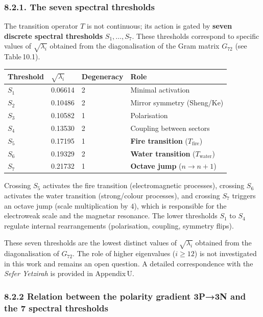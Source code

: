 \documentclass[11pt]{article}
\begin{document}
\hypertarget{the-seven-spectral-thresholds}{%
\subsubsection{8.2.1. The seven spectral
thresholds}\label{the-seven-spectral-thresholds}}

The transition operator \(T\) is not continuous; its action is gated by
\textbf{seven discrete spectral thresholds} \(S_1,\ldots,S_7\). These
thresholds correspond to specific values of \(\sqrt{\lambda_i}\)
obtained from the diagonalisation of the Gram matrix \(G_{72}\) (see
Table\,10.1).

\begin{longtable}[]{@{}llll@{}}
\toprule
Threshold & \(\sqrt{\lambda_i}\) & Degeneracy & Role \\
\midrule
\endhead
\(S_1\) & 0.06614 & 2 & Minimal activation \\
\(S_2\) & 0.10486 & 2 & Mirror symmetry (Sheng/Ke) \\
\(S_3\) & 0.10582 & 1 & Polarisation \\
\(S_4\) & 0.13530 & 2 & Coupling between sectors \\
\(S_5\) & 0.17195 & 1 & \textbf{Fire transition}
(\(T_{\text{fire}}\)) \\
\(S_6\) & 0.19329 & 2 & \textbf{Water transition}
(\(T_{\text{water}}\)) \\
\(S_7\) & 0.21732 & 1 & \textbf{Octave jump} (\(n \to n+1\)) \\
\bottomrule
\end{longtable}

Crossing \(S_5\) activates the fire transition (electromagnetic
processes), crossing \(S_6\) activates the water transition
(strong/colour processes), and crossing \(S_7\) triggers an octave jump
(scale multiplication by \(4\)), which is responsible for the
electroweak scale and the magnetar resonance. The lower thresholds
\(S_1\) to \(S_4\) regulate internal rearrangements (polarisation,
coupling, symmetry flips).

These seven thresholds are the lowest distinct values of
\(\sqrt{\lambda_i}\) obtained from the diagonalisation of \(G_{72}\).
The role of higher eigenvalues (\(i \ge 12\)) is not investigated in
this work and remains an open question. A detailed correspondence with
the \emph{Sefer Yetzirah} is provided in Appendix\,U.

\hypertarget{relation-between-the-polarity-gradient-3p3n-and-the-7-spectral-thresholds}{%
\subsubsection{8.2.2 Relation between the polarity gradient 3P→3N and
the 7 spectral
thresholds}\label{relation-between-the-polarity-gradient-3p3n-and-the-7-spectral-thresholds}}
\end{document}
